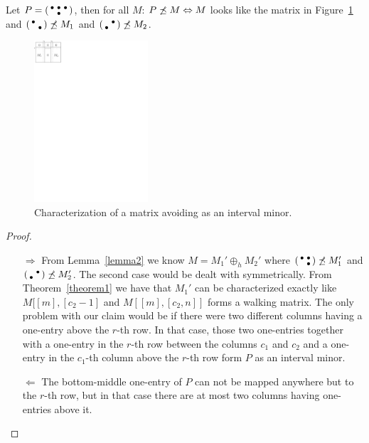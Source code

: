 \begin{thm}
Let $P=\left(\begin{smallmatrix}\bullet&\bullet&\bullet\\ &\bullet& \end{smallmatrix}\right)$, then for all $M$: $P\not\preceq M\Leftrightarrow M$ looks like the matrix in Figure~\ref{p72} and $\left(\begin{smallmatrix}\bullet& \\ &\bullet\end{smallmatrix}\right)\not\preceq M_1$ and $\left(\begin{smallmatrix} &\bullet\\\bullet& \end{smallmatrix}\right)\not\preceq M_2$.
\end{thm}
\begin{figure}[!ht]
\centering
\includegraphics[height=60mm]{img/p72.pdf}
\caption{Characterization of a matrix avoiding \usebox{\smlmatc} as an interval minor.}
\label{p72}
\end{figure}
\begin{proof}
\begin{itemize}
\item[$\Rightarrow$] From Lemma~\ref{lemma2} we know $M=M_1'\oplus_hM_2'$ where $\left(\begin{smallmatrix}\bullet&\bullet\\ &\bullet\end{smallmatrix}\right)\not\preceq M_1'$ and $\left(\begin{smallmatrix} &\bullet\\\bullet& \end{smallmatrix}\right)\not\preceq M_2'$. The second case would be dealt with symmetrically. From Theorem~\ref{theorem1} we have that $M_1'$ can be characterized exactly like $M[[m],[c_2-1]$ and $M[[m],[c_2,n]]$ forms a walking matrix. The only problem with our claim would be if there were two different columns having a one-entry above the $r$-th row. In that case, those two one-entries together with a one-entry in the $r$-th row between the columns $c_1$ and $c_2$ and a one-entry in the $c_1$-th column above the $r$-th row form $P$ as an interval minor.
\item[$\Leftarrow$] The bottom-middle one-entry of $P$ can not be mapped anywhere but to the $r$-th row, but in that case there are at most two columns having one-entries above it. %
\end{itemize}
\end{proof}

